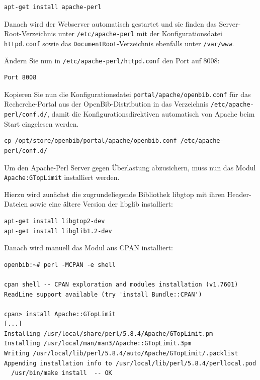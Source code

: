 \documentclass[11pt, twoside, a4paper, BCOR8mm, DIV12, bibtotoc,idxtotoc]{scrbook}
\begin{document}
\begin{verbatim}
apt-get install apache-perl
\end{verbatim}

Danach wird der Webserver automatisch gestartet und sie finden das
Server-Root-Verzeichnis unter \texttt{/etc/apache-perl} mit der
Konfigurationsdatei \texttt{httpd.conf} sowie das
\texttt{DocumentRoot}-Verzeichnis ebenfalls unter \texttt{/var/www}.

Ändern Sie nun in \texttt{/etc/apache-perl/httpd.conf} den Port auf
8008:

\begin{verbatim}
Port 8008
\end{verbatim}

Kopieren Sie nun die Konfigurationsdatei
\texttt{portal/apache/openbib.conf} für das Recherche-Portal aus der
OpenBib-Distribution in das Verzeichnis
\texttt{/etc/apache-perl/conf.d/}, damit die Konfigurationsdirektiven
automatisch von Apache beim Start eingelesen werden.

\begin{verbatim}
cp /opt/store/openbib/portal/apache/openbib.conf /etc/apache-perl/conf.d/
\end{verbatim}

Um den Apache-Perl Server gegen Überlastung abzusichern, muss nun das
Modul \texttt{Apache:GTopLimit} installiert werden.

Hierzu wird zunächst die zugrundeliegende Bibliothek libgtop mit
ihren Header-Dateien sowie eine ältere Version der libglib
installiert:

\begin{verbatim}
apt-get install libgtop2-dev
apt-get install libglib1.2-dev
\end{verbatim}

Danach wird manuell das Modul aus CPAN installiert:

\begin{verbatim}
openbib:~# perl -MCPAN -e shell

cpan shell -- CPAN exploration and modules installation (v1.7601)
ReadLine support available (try 'install Bundle::CPAN')

cpan> install Apache::GTopLimit
[...]
Installing /usr/local/share/perl/5.8.4/Apache/GTopLimit.pm
Installing /usr/local/man/man3/Apache::GTopLimit.3pm
Writing /usr/local/lib/perl/5.8.4/auto/Apache/GTopLimit/.packlist
Appending installation info to /usr/local/lib/perl/5.8.4/perllocal.pod
  /usr/bin/make install  -- OK
\end{verbatim}
\end{document}
